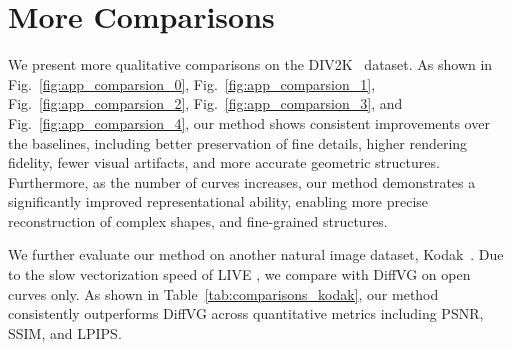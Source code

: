 \section{More Comparisons}





We present more qualitative comparisons on the DIV2K~\cite{Timofte_2017_CVPR_Workshops} dataset. As shown in Fig.~\ref{fig:app_comparsion_0}, Fig.~\ref{fig:app_comparsion_1}, Fig.~\ref{fig:app_comparsion_2}, Fig.~\ref{fig:app_comparsion_3}, and Fig.~\ref{fig:app_comparsion_4}, our method shows consistent improvements over the baselines, including better preservation of fine details, higher rendering fidelity, fewer visual artifacts, and more accurate geometric structures. Furthermore, as the number of curves increases, our method demonstrates a significantly improved representational ability, enabling more precise reconstruction of complex shapes, and fine-grained structures.

We further evaluate our method on another natural image dataset, Kodak~\cite{kodak1999}. Due to the slow vectorization speed of LIVE \cite{xu2022live}, we compare with DiffVG on open curves only. As shown in Table~\ref{tab:comparisons_kodak}, our method consistently outperforms DiffVG across quantitative metrics including PSNR, SSIM, and LPIPS. 






